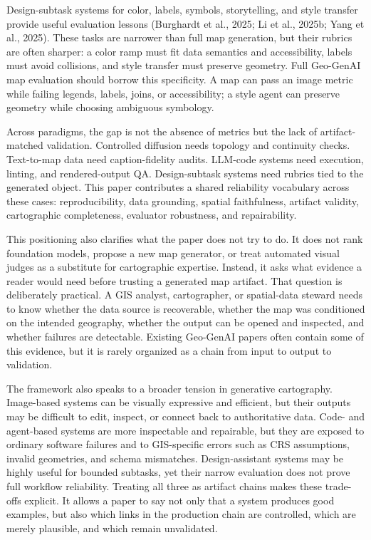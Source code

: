 \documentclass[]{interact}
\begin{document}
Design-subtask systems for color, labels, symbols, storytelling, and style transfer provide useful evaluation lessons (Burghardt et al., 2025; Li et al., 2025b; Yang et al., 2025). These tasks are narrower than full map generation, but their rubrics are often sharper: a color ramp must fit data semantics and accessibility, labels must avoid collisions, and style transfer must preserve geometry. Full Geo-GenAI map evaluation should borrow this specificity. A map can pass an image metric while failing legends, labels, joins, or accessibility; a style agent can preserve geometry while choosing ambiguous symbology.

Across paradigms, the gap is not the absence of metrics but the lack of artifact-matched validation. Controlled diffusion needs topology and continuity checks. Text-to-map data need caption-fidelity audits. LLM-code systems need execution, linting, and rendered-output QA. Design-subtask systems need rubrics tied to the generated object. This paper contributes a shared reliability vocabulary across these cases: reproducibility, data grounding, spatial faithfulness, artifact validity, cartographic completeness, evaluator robustness, and repairability.

This positioning also clarifies what the paper does not try to do. It does not rank foundation models, propose a new map generator, or treat automated visual judges as a substitute for cartographic expertise. Instead, it asks what evidence a reader would need before trusting a generated map artifact. That question is deliberately practical. A GIS analyst, cartographer, or spatial-data steward needs to know whether the data source is recoverable, whether the map was conditioned on the intended geography, whether the output can be opened and inspected, and whether failures are detectable. Existing Geo-GenAI papers often contain some of this evidence, but it is rarely organized as a chain from input to output to validation.

The framework also speaks to a broader tension in generative cartography. Image-based systems can be visually expressive and efficient, but their outputs may be difficult to edit, inspect, or connect back to authoritative data. Code- and agent-based systems are more inspectable and repairable, but they are exposed to ordinary software failures and to GIS-specific errors such as CRS assumptions, invalid geometries, and schema mismatches. Design-assistant systems may be highly useful for bounded subtasks, yet their narrow evaluation does not prove full workflow reliability. Treating all three as artifact chains makes these trade-offs explicit. It allows a paper to say not only that a system produces good examples, but also which links in the production chain are controlled, which are merely plausible, and which remain unvalidated.
\end{document}
